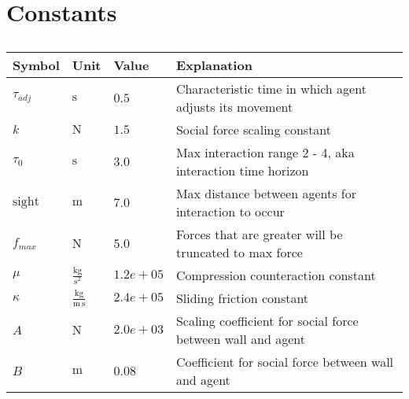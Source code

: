 \section{Constants}

\begin{table}[H]
\begin{tabular}{llll}
Symbol         & Unit & Value & Explanation \\
\hline
$ \tau_{adj} $ & $ \mathrm{s} $ & $ 0.5 $ & Characteristic time in which agent adjusts its movement \\
$ k $          & $ \mathrm{N} $ & $ 1.5 $ & Social force scaling constant \\
$ \tau_{0} $   & $ \mathrm{s} $ & $ 3.0 $ & Max interaction range 2 - 4, aka interaction time horizon \\
$ \text{sight} $      & $ \mathrm{m} $ & $ 7.0 $ & Max distance between agents for interaction to occur \\
$ f_{max} $    & $ \mathrm{N} $ & $ 5.0 $ & Forces that are greater will be truncated to max force \\
$ \mu $        & $ \mathrm{\frac{kg}{s^{2}}} $ & $ 1.2e+05 $ & Compression counteraction constant \\
$ \kappa $     & $ \mathrm{\frac{kg}{m\,s}} $ & $ 2.4e+05 $ & Sliding friction constant \\
$ A $          & $ \mathrm{N} $ & $ 2.0e+03 $ & Scaling coefficient for social force between wall and agent \\
$ B $          & $ \mathrm{m} $ & $ 0.08 $ & Coefficient for social force between wall and agent \\
\end{tabular} 
\caption{}
\end{table}
